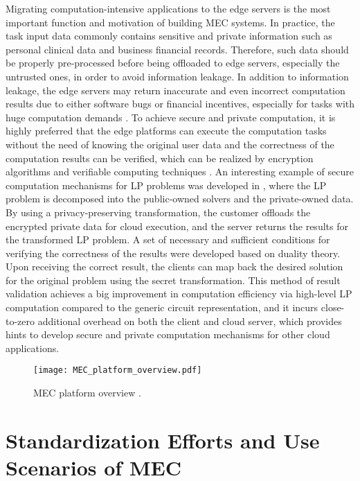 \documentclass[journal]{IEEEtran}
\begin{document}
{Migrating computation-intensive applications to the edge servers is the most important function and motivation of building MEC systems. In practice, the task input data commonly contains sensitive and private information such as personal clinical data and business financial records. Therefore, such data should be properly pre-processed before being offloaded to edge servers, especially the untrusted ones, in order to avoid information leakage. In addition to information leakage, the edge servers may return inaccurate and even incorrect computation results  due to either software bugs or financial incentives, especially for tasks with huge computation demands \cite{CWang1601}. To achieve secure and private computation, it is highly preferred that the edge platforms can execute the computation tasks without the need of knowing the original user data and the correctness of the computation results can be verified, which can be realized by encryption algorithms and verifiable computing techniques \cite{Gennaro10}. An interesting example of secure computation mechanisms for LP problems was developed in \cite{CWang1601}, where the LP problem is decomposed into the public-owned solvers and the private-owned data. By using a privacy-preserving transformation, the customer offloads the encrypted private data for cloud execution, and the server returns the results for the transformed LP problem. A set of necessary and sufficient conditions for verifying the correctness of the results were developed based on duality theory. Upon receiving the correct result, the clients can map back the desired solution for the original problem using the secret transformation. This method of result validation achieves a big improvement in computation efficiency via high-level LP computation compared to the generic circuit representation, and it incurs close-to-zero additional overhead on both the client and cloud server, which provides hints to develop secure and private computation mechanisms for other cloud applications.
\begin{figure*}[!t]
\begin{center}
   \texttt{[image: MEC\_platform\_overview.pdf]}
\end{center}
\caption{MEC platform overview \cite{ETSI14}.}
\label{MECplatformOverview}
\end{figure*}
\section{Standardization Efforts and Use Scenarios of MEC}\label{Section:Standard}

}
\end{document}
